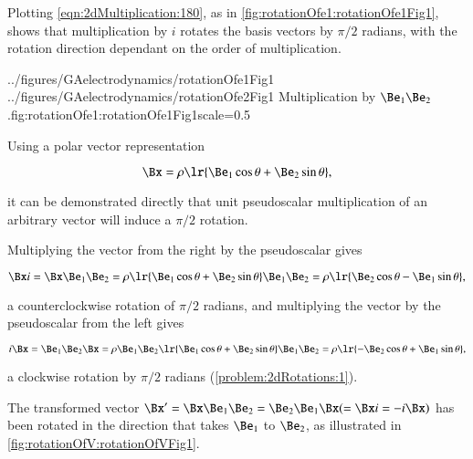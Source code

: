%
%

Plotting \cref{eqn:2dMultiplication:180}, as in
\cref{fig:rotationOfe1:rotationOfe1Fig1},
 shows that multiplication by \( i \) rotates the  basis vectors by \( \pi/2 \) radians,
with the
rotation direction dependant on the order of multiplication.

\imageTwoFigures
{../figures/GAelectrodynamics/rotationOfe1Fig1}
{../figures/GAelectrodynamics/rotationOfe2Fig1}
{Multiplication by \( \Be_1 \Be_2 \).}{fig:rotationOfe1:rotationOfe1Fig1}{scale=0.5}

Using a polar vector representation

\begin{dmath}\label{eqn:2dRotations:280}
   \Bx = \rho \lr{ \Be_1 \cos\theta + \Be_2 \sin\theta },
\end{dmath}

it can be
demonstrated directly that
unit pseudoscalar multiplication of an arbitrary vector will induce a \( \pi/2 \) rotation.

Multiplying the vector from the right by the pseudoscalar gives

\begin{dmath}\label{eqn:2dRotations:300}
\Bx i
= \Bx \Be_1 \Be_2
= \rho \lr{ \Be_1 \cos\theta + \Be_2 \sin\theta } \Be_1 \Be_2
= \rho \lr{ \Be_2 \cos\theta - \Be_1 \sin\theta },
\end{dmath}

a counterclockwise rotation of \( \pi/2 \) radians, and
multiplying the vector by the pseudoscalar from the left gives

\begin{dmath}\label{eqn:2dRotations:3}
i \Bx
= \Be_1 \Be_2 \Bx
= \rho \Be_1 \Be_2 \lr{ \Be_1 \cos\theta + \Be_2 \sin\theta } \Be_1 \Be_2
= \rho \lr{ -\Be_2 \cos\theta + \Be_1 \sin\theta },
\end{dmath}

a clockwise rotation by \( \pi/2 \) radians
(\cref{problem:2dRotations:1}).

The transformed vector \( \Bx' = \Bx \Be_1 \Be_2 = \Be_2 \Be_1 \Bx (=\Bx i = -i \Bx) \) has been rotated in the direction that takes \( \Be_1 \) to \( \Be_2 \), as illustrated
in \cref{fig:rotationOfV:rotationOfVFig1}.


